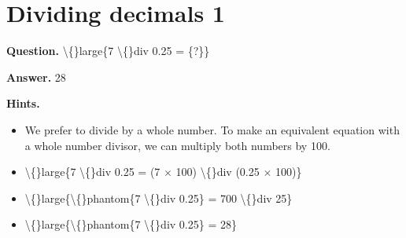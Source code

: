 \documentclass{article}
\begin{document}
\section*{Dividing decimals 1}
\textbf{Question.} \textbackslash\{\}large\{7 \textbackslash\{\}div 0.25 = \{?\}\}

\textbf{Answer.} 28

\textbf{Hints.}
\begin{itemize}
  \item We prefer to divide by a whole number.
                To make an equivalent equation with a whole number divisor, we can multiply both numbers by 100.
  \item \textbackslash\{\}large\{7 \textbackslash\{\}div 0.25 =
                (7 $\times$ 100) \textbackslash\{\}div (0.25 $\times$ 100)\}
  \item \textbackslash\{\}large\{\textbackslash\{\}phantom\{7 \textbackslash\{\}div 0.25\} =
                700 \textbackslash\{\}div 25\}
  \item \textbackslash\{\}large\{\textbackslash\{\}phantom\{7 \textbackslash\{\}div 0.25\} = 28\}
\end{itemize}
\end{document}
